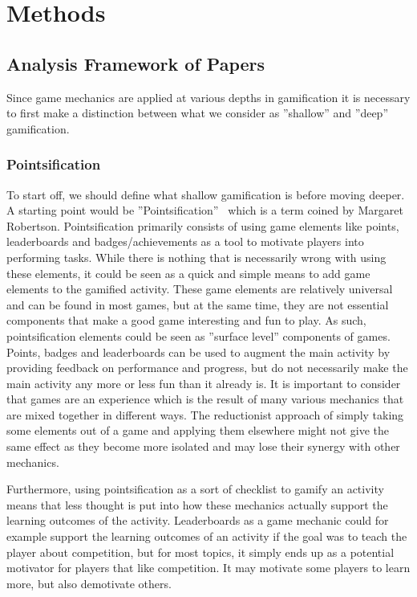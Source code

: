\section{Methods}
\subsection{Analysis Framework of Papers}    
Since game mechanics are applied at various depths in gamification it is necessary to first make a distinction between what we consider as ''shallow'' and ''deep'' gamification. 

\subsubsection{Pointsification}\label{sec:pointsification}
To start off, we should define what shallow gamification is before moving deeper. A starting point would be ''Pointsification''~\cite{robertson2010} which is a term coined by Margaret Robertson. Pointsification primarily consists of using game elements like points, leaderboards and badges/achievements as a tool to motivate players into performing tasks. While there is nothing that is necessarily wrong with using these elements, it could be seen as a quick and simple means to add game elements to the gamified activity. These game elements are relatively universal and can be found in most games, but at the same time, they are not essential components that make a good game interesting and fun to play. As such, pointsification elements could be seen as ''surface level'' components of games. Points, badges and leaderboards can be used to augment the main activity by providing feedback on performance and progress, but do not necessarily make the main activity any more or less fun than it already is. It is important to consider that games are an experience which is the result of many various mechanics that are mixed together in different ways. The reductionist approach of simply taking some elements out of a game and applying them elsewhere might not give the same effect as they become more isolated and may lose their synergy with other mechanics. 

Furthermore, using pointsification as a sort of checklist to gamify an activity means that less thought is put into how these mechanics actually support the learning outcomes of the activity. Leaderboards as a game mechanic could for example support the learning outcomes of an activity if the goal was to teach the player about competition, but for most topics, it simply ends up as a potential motivator for players that like competition. It may motivate some players to learn more, but also demotivate others.


